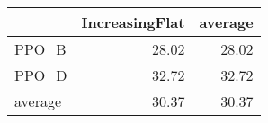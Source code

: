 \begin{tabular}{lrr}
\toprule
{} &  IncreasingFlat &  average \\
\midrule
PPO\_B   &           28.02 &    28.02 \\
PPO\_D   &           32.72 &    32.72 \\
average &           30.37 &    30.37 \\
\bottomrule
\end{tabular}
